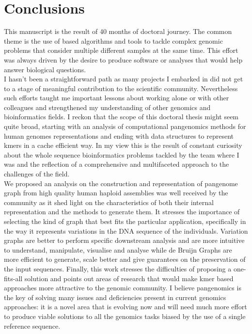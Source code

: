 \chapter{Conclusions}
\label{sec:conclusions}
This manuscript is the result of 40 months of doctoral journey. The common theme is the use of \kmer based algorithms and tools to tackle complex genomic problems that consider multiple different samples at the same time. This effort was always driven by the desire to produce software or analyses that would help answer biological questions.\\
I hasn’t been a straightforward path as many projects I embarked in did not get to a stage of meaningful contribution to the scientific community. Nevertheless such efforts taught me important lessons about working alone or with other colleagues and strengthened my understanding of other genomics and bioinformatics fields.
I reckon that the scope of this doctoral thesis might seem quite broad, starting with an analysis of computational pangenomics methods for human genomes representations and ending with data structures to represent kmers in a cache efficient way. In my view this is the result of constant curiosity about the whole sequence bioinformatics problems tackled by the team where I was and the reflection of a comprehensive and multifaceted approach to the challenges of the field.\\
We proposed an analysis on the construction and representation of pangenome graph from high quality human haploid assemblies was well received by the community as it shed light on the characteristics of both their internal representation and the methods to generate them. It stresses the importance of selecting the kind of graph that best fits the particular application, specifically in the way it represents variations in the DNA sequence of the individuals. Variation graphs are better to perform specific downstream analysis and are more intuitive to understand, manipulate, visualise and analyse while de Bruijn Graphs are more efficient to generate, scale better and give guarantees on the preservation of the input sequences. Finally, this work stresses the difficulties of proposing a one-fits-all solution and points out areas of research that would make kmer based approaches more attractive to the genomic community. I believe pangenomics is the key of solving many issues and deficiencies present in current genomics approaches: it is a novel area that is evolving now and will need much more effort to produce viable solutions to all the genomics tasks biased by the use of a single reference sequence.\\
